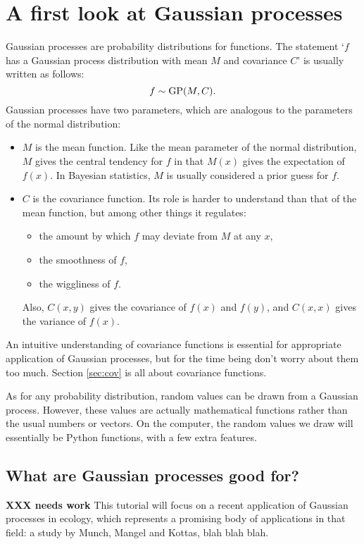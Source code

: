 \documentclass{manual}
\begin{document}
\section{A first look at Gaussian processes}\label{sec:firstlook} %

Gaussian processes are probability distributions for functions. The statement `$f$ has a Gaussian process distribution with mean $M$ and covariance $C$' is usually written as follows:
\begin{equation}
    f\sim\textup{GP}(M,C).
\end{equation}
Gaussian processes have two parameters, which are analogous to the parameters of the normal distribution:
\begin{itemize}
    \item $M$ is the mean function. Like the mean parameter of the normal distribution, $M$ gives the central tendency for $f$ in that $M(x)$ gives the expectation of $f(x)$. In Bayesian statistics, $M$ is usually considered a prior guess for $f$.
    \item $C$  is the covariance function. Its role is harder to understand than that of the mean function, but among other things it regulates:
    \begin{itemize}
        \item the amount by which $f$ may deviate from $M$ at any $x$,
        \item the smoothness of $f$,
        \item the wiggliness of $f$.
    \end{itemize}
Also, $C(x,y)$ gives the covariance of $f(x)$ and $f(y)$, and $C(x,x)$ gives the variance of $f(x)$.
\end{itemize}
An intuitive understanding of covariance functions is essential for appropriate application of Gaussian processes, but for the time being don't worry about them too much. Section \ref{sec:cov} is all about covariance functions.

As for any probability distribution, random values can be drawn from a Gaussian process. However, these values are actually mathematical functions rather than the usual numbers or vectors. On the computer, the random values we draw will essentially be Python functions, with a few extra features.

\subsection{What are Gaussian processes good for?}\label{sub:applications}
\textbf{XXX needs work}
This tutorial will focus on a recent application of Gaussian processes in ecology, which represents a promising body of applications in that field: a study by Munch, Mangel and Kottas, blah blah blah.
\end{document}
